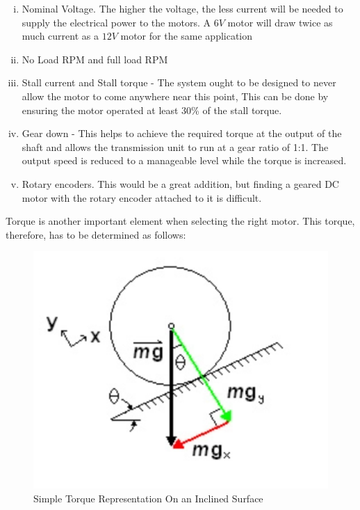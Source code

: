 \begin{enumerate}[i.]
    \item  Nominal Voltage. The higher the voltage, the less current will be needed to supply the electrical power to the motors. A $6 V$ motor will draw twice as much current as a $12 V$ motor for the same application 
    \item No Load \ac{RPM} and full load \ac{RPM}
    \item Stall current and Stall torque - The system ought to be designed to never allow the motor to come anywhere near this point, This can be done by ensuring the motor operated at least 30\% of the stall torque.
    \item Gear down - This helps to achieve the required torque at the output of the shaft and allows the transmission unit to run at a gear ratio of 1:1. The output speed is reduced to a manageable level while the torque is increased.
    \item Rotary encoders. This would be a great addition, but finding a geared \ac{DC} motor with the rotary encoder attached to it is difficult.
\end{enumerate}

Torque is another important element when selecting the right motor. This torque, therefore, has to be determined as follows:
\begin{figure}[h]
    \centering
    \includegraphics[scale=0.5]{Figures/simpleTorque.png}
    \caption{Simple Torque Representation On an Inclined Surface}
    \label{fig:simpletorque}
\end{figure}

